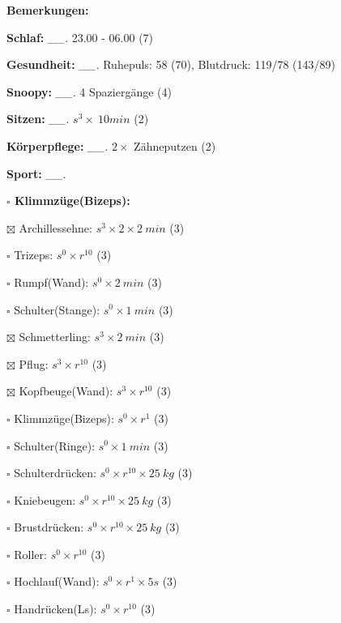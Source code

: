 \documentclass[10pt,a4paper]{article}
\newcommand\prop[1] {{\color {alizarin} {\bf #1}}}             %
\newcommand\mand[1] {{\color {burntorange} {\bf #1}}}          %
\newcommand\topspace{\vskip -15pt \hskip 20pt}
\newcommand\n[1] { {\sl #1.} \hskip 5pt }
\begin{document}
\begin{mdframed}[style=daystyle]
  \begin{labeling}{{\mand {Bemerkungen:}}}
    \setlength\itemsep{-3pt}
  \item[{\mand {Schlaf:}}]        \n{\_\_} 23.00 - 06.00 (7)
  \item[{\mand {Gesundheit:}}]    \n{\_\_} Ruhepuls: 58 (70), Blutdruck: 119/78 (143/89)
  \item[{\mand {Snoopy:}}]        \n{\_\_} 4 Spaziergänge (4)
  \item[{\mand {Sitzen:}}]        \n{\_\_} $s^3 \times\ 10 min$ (2)
  \item[{\mand {Körperpflege:}}]  \n{\_\_} $2 \times$ Zähneputzen (2)
  \item[{\mand {Sport:}}]         \n{\_\_}
    \topspace
    \begin{minipage}{0.75\textwidth}  
      \begin{labeling}{\prop {$\square$ {Klimmzüge(Bizeps):}}}
        \setlength\itemsep{-3pt}
      \item[$\boxtimes$ Archillessehne:]    $s^3 \times 2 \times 2\ min$ (3)
      \item[$\square$ Trizeps:]           $s^0 \times r^{10}$ (3)
      \item[$\square$ Rumpf(Wand):]       $s^0 \times 2\ min$ (3)
      \item[$\square$ Schulter(Stange):]  $s^0 \times 1\ min$ (3)
      \item[$\boxtimes$ Schmetterling:]     $s^3 \times 2\ min$ (3)
      \item[$\boxtimes$ Pflug:]             $s^3 \times r^{10}$ (3)
      \item[$\boxtimes$ Kopfbeuge(Wand):]   $s^3 \times r^{10}$ (3)
      \item[$\square$ Klimmzüge(Bizeps):] $s^0 \times r^1$ (3)
      \item[$\square$ Schulter(Ringe):]   $s^0 \times 1\ min$ (3)
      \item[$\square$ Schulterdrücken:]   $s^0 \times r^{10} \times 25\ kg$ (3)
      \item[$\square$ Kniebeugen:]        $s^0 \times r^{10} \times 25\ kg$ (3)
      \item[$\square$ Brustdrücken:]      $s^0 \times r^{10} \times 25\ kg$ (3)
      \item[$\square$ Roller:]            $s^0 \times r^{10}$ (3)
      \item[$\square$ Hochlauf(Wand):]    $s^0 \times r^{1} \times 5s$ (3)
      \item[$\square$ Handrücken(Ls):]    $s^0 \times r^{10}$ (3)

\end{labeling}
\end{minipage}
\end{labeling}
\end{mdframed}
\end{document}
